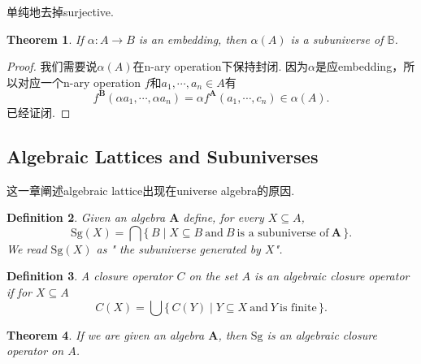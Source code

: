 \documentclass{article}
\newtheorem{theorem}{Theorem}[section]
\newtheorem{definition}[theorem]{Definition}
\newcommand*{\xfunc}[4]{{#2}\colon{#3}{#1}{#4}}
\newcommand*{\func}[3]{\xfunc{\to}{#1}{#2}{#3}}
\newcommand\Set[2]{\{\,#1\mid#2\,\}} %
\newcommand\Sg{\text{Sg}}
\begin{document}
{\color{blue} 单纯地去掉surjective.}

\begin{theorem}
If $\func{\alpha}{A}{B}$ is an embedding, then $\alpha(A)$ is a subuniverse of $\mathbb{B}$.
\end{theorem}

\begin{proof}
我们需要说$\alpha(A)$在n-ary operation下保持封闭. 因为$\alpha$是应embedding，所以对应一个n-ary operation $f$和$a_1,\cdots,a_n \in A$有
$$
f^\mathbf{B}(\alpha a_1,\cdots,\alpha a_n) = \alpha f^\mathbf{A}(a_1,\cdots,c_n) \in \alpha(A).
$$
已经证闭.
\end{proof}

\newpage
\subsection{Algebraic Lattices and Subuniverses}

{\color{red} 这一章阐述algebraic lattice出现在universe algebra的原因}.

\begin{definition}
\rm Given an algebra $\mathbf{A}$ define, for every $X \subseteq A$,
$$
\Sg(X) = \bigcap \Set{B}{X \subseteq B\ \text{and}\ B\ \text{is a subuniverse of}\ \mathbf{A}}.
$$ 
We read $\Sg(X)$ as "{\color{red} the subuniverse generated by $X$}".
\end{definition}

\begin{definition}
\rm A closure operator $C$ on the set $A$ is an {\color{red} algebraic closure  operator} if for $X \subseteq A$
$$
C(X) = \bigcup\Set{C(Y)}{Y \subseteq X\ \text{and}\ Y\ \text{is finite}}.
$$
\end{definition}

\begin{theorem}
\rm If we are given an algebra $\mathbf{A}$, then $\Sg$ is an algebraic closure operator on $A$.
\end{theorem}
\end{document}
